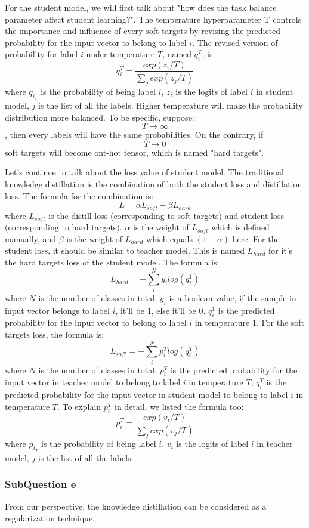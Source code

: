 \documentclass[conference]{IEEEtran}
\begin{document}
For the student model, we will first talk about "how does the task balance parameter affect student learning?".
The temperature hyperparameter T controls the importance and influence of every soft targets by revising the predicted probability for the input vector to belong to label $i$. The revised version of probability for label $i$ under temperature $T$, named $q_{i}^{T}$, is:
$$q_{i}^{T}=\frac{exp(z_{i}/T)}{\sum_{j}exp(z_{j}/T)}$$
where $q_{i}_{T}$ is the probability of being label $i$, $z_{i}$ is the logits of label $i$ in student model, $j$ is the list of all the labels.
Higher temperature will make the probability distribution more balanced. To be specific, suppose: $$T\to \infty $$, then every labels will have the same probabilities. 
On the contrary, if $$T\to 0 $$ soft targets will become ont-hot tensor, which is named "hard targets".\par
Let's continue to talk about the loss value of student model. The traditional knowledge distillation is the combination of both the student loss and distillation loss.
The formula for the combination is:
$$L=\alpha L_{soft}+\beta L_{hard}$$
where $L_{soft}$ is the distill loss (corresponding to soft targets) and student loss (corresponding to hard targets). $\alpha$ is the weight of $L_{soft}$ which is defined manually, and $\beta$ is the weight of $L_{hard}$ which equals $(1-\alpha)$ here.
For the student loss, it should be similar to teacher model. This is named $L_{hard}$ for it's the hard targets loss of the student model. The formula is:
$$L_{hard}=-\sum_{i}^{N}y_{i}log(q_{i}^{1})$$
where $N$ is the number of classes in total, $y_{i}$ is a boolean value, if the sample in input vector belongs to label $i$, it'll be 1, else it'll be 0. $q_{i}^{1}$ is the predicted probability for the input vector to belong to label $i$ in temperature $1$.
For the soft targets loss, the formula is:
$$L_{soft}=-\sum_{i}^{N}p_{i}^{T}log(q_{i}^{T})$$
where $N$ is the number of classes in total, $p_{i}^{T}$ is the predicted probability for the input vector in teacher model to belong to label $i$ in temperature $T$, $q_{i}^{T}$ is the predicted probability for the input vector in student model to belong to label $i$ in temperature $T$.
To explain $p_{i}^{T}$ in detail, we listed the formula too:
$$p_{i}^{T}=\frac{exp(v_{i}/T)}{\sum_{j}exp(v_{j}/T)}$$
where $p_{i}_{T}$ is the probability of being label $i$, $v_{i}$ is the logits of label $i$ in teacher model, $j$ is the list of all the labels.
\subsubsection{SubQuestion e}
From our perspective, the knowledge distillation can be considered as a regularization technique.
\end{document}
